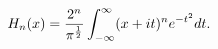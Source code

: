 \[\mathop{H_{n}\/}\nolimits\!\left(x\right)=\frac{2^{n}}{\pi^{\frac{1}{2}}}\int_%
{-\infty}^{\infty}(x+it)^{n}e^{-t^{2}}dt.\]